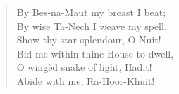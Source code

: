 \begin{center}
\begin{verse}
  By Bes-na-Maut my breast I beat; \\
  \hspace{1em} By wise Ta-Nech I weave my spell, \\
  Show thy star-splendour, O Nuit! \\
  \hspace{1em} Bid me within thine House to dwell, \\
  O wing\`{e}d snake of light, Hadit! \\
  \hspace{1em} Abide with me, Ra-Hoor-Khuit!
\end{verse}
\end{center}
